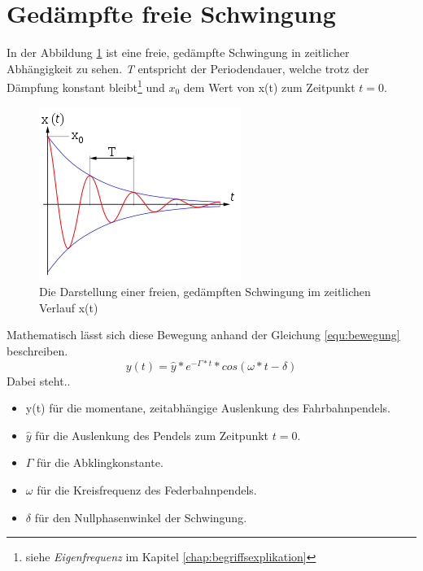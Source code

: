 \section{Gedämpfte freie Schwingung}
In der Abbildung \ref{fig:gedaempfteSchwingung} ist eine freie, gedämpfte Schwingung in zeitlicher Abhängigkeit zu sehen. \textit{T} entspricht der Periodendauer, welche trotz der Dämpfung konstant bleibt\footnote{siehe \textit{Eigenfrequenz} im Kapitel \ref{chap:begriffsexplikation}} 
und $x_{0}$ dem Wert von x(t) zum Zeitpunkt $t=0$.
\begin{figure}[h]
\centering
\includegraphics[scale=0.8]{Bilder/gedaempfte_schwingung.png}
\caption{Die Darstellung einer freien, gedämpften Schwingung im zeitlichen Verlauf x(t) \cite{freueSchw}}
\label{fig:gedaempfteSchwingung}
\end{figure}
\newpage
Mathematisch lässt sich diese Bewegung anhand der Gleichung \ref{equ:bewegung} beschreiben.
\begin{equation}
y(t) = \hat{y} * e^{-\Gamma*t} * cos(\omega*t-\delta)
\label{equ:bewegung}
\end{equation}
Dabei steht..
\begin{itemize}
	\item y(t) für die momentane, zeitabhängige Auslenkung des Fahrbahnpendels.
	\item $\hat{y}$ für die Auslenkung des Pendels zum Zeitpunkt $t=0$.
	\item $\Gamma$ für die Abklingkonstante.
	\item $\omega$ für die Kreisfrequenz des Federbahnpendels.
	\item $\delta$ für den Nullphasenwinkel der Schwingung.
\end{itemize}
\vspace*{0.5cm}
